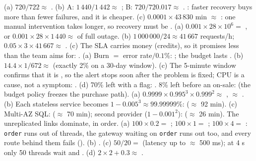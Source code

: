  (a) $720/722 \approx$ . (b) A: $1\,440/1\,442 \approx$ ; B: $720/720.017 \approx$ . : faster recovery buys more than fewer failures, and it is cheaper. (c) $0.0001 \times 43\,830$ min $\approx$ : one manual intervention takes longer, so recovery must be .
 (a) $0.001 \times 28 \times 10^6 =$ , or $0.001 \times 28 \times 1\,440 \approx$  of full outage. (b) $1\,000\,000/24 \approx 41\,667$ requests/h; $0.05 \times 3 \times 41\,667 \approx$ . (c) The SLA carries money (credits), so it promises less than the team aims for: .
 (a) Burn $=$ error rate$/0.1\%$: ; the budget lasts . (b) $14.4 \times 1/672 \approx$  (exactly 2\% on a 30-day window). (c) The 5-minute window confirms that it is , so the alert stops soon after the problem is fixed; CPU is a cause, not a symptom: . (d) 70\% left with a flag: . 8\% left before an on-sale:  (the budget policy freezes the purchase path).
 (a) $0.9999 \times 0.995^3 \times 0.999^2 \approx$ , $\approx$ . (b) Each stateless service becomes $1 - 0.005^3 \approx 99.99999\%$:  ($\approx$ 92 min). (c) Multi-AZ SQL:  ($\approx$ 70 min); second provider ($1 - 0.001^2$):  ($\approx$ 26 min). The unreplicated links dominate, in order.
 (a) $100 \times 0.2 =$ ; $100 \times 1 =$ ; $100 \times 4 =$ : \texttt{order} runs out of threads, the gateway waiting on \texttt{order} runs out too, and every route behind them fails (). (b) . (c) $50/20 =$  (latency up to $\approx$ 500 ms); at 4 s only 50 threads wait and . (d) $2 \times 2 + 0.3 \approx$ .

